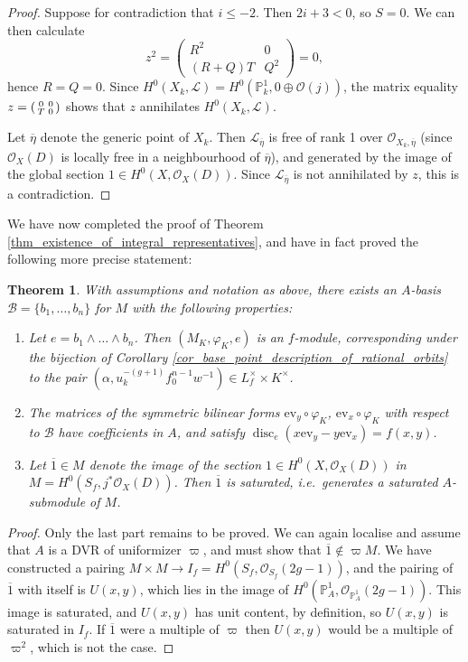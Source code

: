 \documentclass{article} %
\newtheorem{theorem}[proposition]{Theorem}
\numberwithin{equation}{section}
\newcommand{\bbP}{\mathbb{P}}
\newcommand{\cO}{\mathcal{O}}
\DeclareMathOperator{\disc}{disc}
\begin{document}
\begin{proof}
    Suppose for contradiction that $i \leq -2$. Then $2i+3 < 0$, so $S = 0$. We can then calculate
    \[ z^2 = \left( \begin{array}{cc} R^2 & 0 \\ (R+Q)T & Q^2 \end{array}\right) = 0, \]
    hence $R = Q = 0$. Since $H^0(X_k, \mathcal{L}) = H^0(\bbP^1_k, 0 \oplus \cO(j))$, the matrix equality $z = \begin{psmallmatrix} 0 & 0 \\ T & 0 \end{psmallmatrix}$ shows that $z$ annihilates $H^0(X_k, \mathcal{L})$. 
    
    Let $\overline{\eta}$ denote the generic point of $X_k$. Then $\mathcal{L}_{\overline{\eta}}$ is free of rank 1 over $\cO_{X_k, \overline{\eta}}$ (since $\cO_X(D)$ is locally free in a neighbourhood of $\overline{\eta}$), and generated by the image of the global section $1 \in H^0(X, \cO_X(D))$. Since $\mathcal{L}_{\overline{\eta}}$ is not annihilated by $z$, this is a contradiction.
\end{proof}
We have now completed the proof of Theorem \ref{thm_existence_of_integral_representatives}, and have in fact proved the following more precise statement:
\begin{theorem}\label{thm_tautological_section_is_saturated}
    With assumptions and notation as above, there exists an $A$-basis $\mathcal{B} = \{ b_1, \dots, b_n \}$ for $M$ with the following properties:
    \begin{enumerate}
        \item Let $e = b_1 \wedge \dots \wedge b_n$. Then $(M_K, \varphi_K, e)$ is an $f$-module, corresponding under the bijection of Corollary \ref{cor_base_point_description_of_rational_orbits} to the pair $(\alpha, u_k^{-(g+1)} f_0^{n-1} w^{-1}) \in L_f^\times \times K^\times$.
        \item The matrices of the symmetric bilinear forms $\mathrm{ev}_y \circ \varphi_K$, $\mathrm{ev}_x \circ \varphi_K$ with respect to $\mathcal{B}$ have coefficients in $A$, and satisfy $\disc_e(x \mathrm{ev}_y - y \mathrm{ev}_x) = f(x, y)$.
        \item Let $\overline{1} \in M$ denote the image of the section $1 \in H^0(X, \cO_X(D))$ in $M = H^0(S_f, j^\ast \cO_X(D))$. Then $\overline{1}$ is saturated, i.e.\ generates a saturated $A$-submodule of $M$. 
    \end{enumerate}
\end{theorem}
\begin{proof}
    Only the last part remains to be proved. We can again localise and assume that $A$ is a DVR of uniformizer $\varpi$, and must show that $\overline{1} \not\in \varpi M$. We have constructed a pairing $M \times M \to I_f = H^0(S_f, \cO_{S_f}(2g-1))$, and the pairing of $\overline{1}$ with itself is $U(x, y)$, which lies in the image of $H^0(\bbP^1_A, \cO_{\bbP^1_A}(2g-1))$. This image is saturated, and $U(x, y)$ has unit content, by definition, so $U(x, y)$ is saturated in $I_f$. If $\overline{1}$ were a multiple of $\varpi$ then $U(x, y)$ would be a multiple of $\varpi^2$, which is not the case. 
\end{proof}
\end{document}
